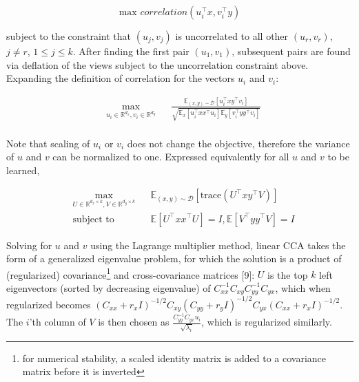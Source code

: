 \documentclass{article} %
\begin{document}
\begin{equation}
\text{max } correlation(u_i^{\top}x, v_i^{\top}y)
\end{equation}

subject to the constraint that $(u_j, v_j)$ is uncorrelated to all other $(u_r, v_r)$, $j \neq r$, $1 \leq j \leq k$. After finding the first pair $(u_1, v_1)$, subsequent pairs are found via deflation of the views subject to the uncorrelation constraint above. Expanding the definition of correlation for the vectors $u_i$ and $v_i$:

\begin{equation}
\begin{aligned}
& \underset{u_i \in \mathbb{R}^{d_x}, v_i \in \mathbb{R}^{d_y}}{\text{max}}
& & \frac{\mathbb{E}_{(x, y) \sim \mathcal{D}}\left[u_i^{\top}xy^{\top}v_i\right]}{\sqrt{\mathbb{E}_x[u_i^{\top}xx^{\top}u_i] \mathbb{E}_y[v_i^{\top}yy^{\top}v_i] }} \\
\end{aligned}
\end{equation}

Note that scaling of $u_i$ or $v_i$ does not change the objective, therefore the variance of $u$ and $v$ can be normalized to one. Expressed equivalently for all $u$ and $v$ to be learned, 

\begin{equation}
\begin{aligned}
& \underset{U \in \mathbb{R}^{d_x \times k}, V \in \mathbb{R}^{d_y \times k}}{\text{max}}
& & \mathbb{E}_{(x, y) \sim \mathcal{D}}\left[\text{trace}\left(U^{\top}xy^{\top}V\right)\right] \\
& \text{subject to}
& & \mathbb{E}[U^{\top}xx^{\top}U] = I, \mathbb{E}[V^{\top}yy^{\top}V] = I
\end{aligned}
\end{equation}

Solving for $u$ and $v$ using the Lagrange multiplier method, linear CCA takes the form of a generalized eigenvalue problem, for which the solution is a product of (regularized) covariance\footnote{for numerical stability, a scaled identity matrix is added to a covariance matrix before it is inverted} and cross-covariance matrices [9]: $U$ is the top $k$ left eigenvectors (sorted by decreasing eigenvalue) of $C_{xx}^{-1}C_{xy}C_{yy}^{-1}C_{yx}$, which when regularized becomes $(C_{xx} + r_xI)^{-1/2}C_{xy}(C_{yy} + r_yI)^{-1/2}C_{yx}(C_{xx} + r_xI)^{-1/2}$. The $i$'th column of $V$ is then chosen as $\frac{C_{yy}^{-1}C_{yx}u_i}{\sqrt{\lambda_i}}$, which is regularized similarly. 
\end{document}
